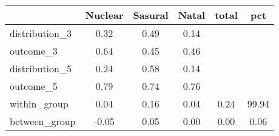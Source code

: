 \begin{tabular}{l*{5}{c}}
\toprule
            &\multicolumn{1}{c}{Nuclear}&\multicolumn{1}{c}{Sasural}&\multicolumn{1}{c}{Natal}&\multicolumn{1}{c}{total}&\multicolumn{1}{c}{pct}\\
\midrule
\midrule
distribution\_3&        0.32&        0.49&        0.14&            &            \\
outcome\_3   &        0.64&        0.45&        0.46&            &            \\
distribution\_5&        0.24&        0.58&        0.14&            &            \\
outcome\_5   &        0.79&        0.74&        0.76&            &            \\
within\_group&        0.04&        0.16&        0.04&        0.24&       99.94\\
between\_group&       -0.05&        0.05&        0.00&        0.00&        0.06\\
\bottomrule
\end{tabular}
